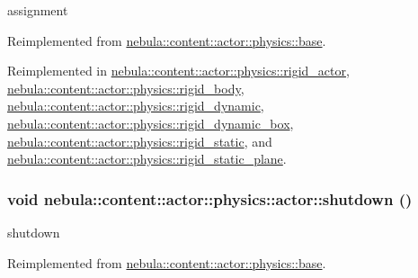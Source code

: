 assignment 

Reimplemented from \hyperlink{classnebula_1_1content_1_1actor_1_1physics_1_1base_a8b950d8d7230bd6899cb3da7b6116f02}{nebula::content::actor::physics::base}.

Reimplemented in \hyperlink{classnebula_1_1content_1_1actor_1_1physics_1_1rigid__actor_aa3d6e979793753e37b9b95b118e40c67}{nebula::content::actor::physics::rigid\_\-actor}, \hyperlink{classnebula_1_1content_1_1actor_1_1physics_1_1rigid__body_afeaa8197cacc9b3f9e2b618f0ee0443b}{nebula::content::actor::physics::rigid\_\-body}, \hyperlink{classnebula_1_1content_1_1actor_1_1physics_1_1rigid__dynamic_a115e82dbc90ce5ae9f8d41724f1bd44d}{nebula::content::actor::physics::rigid\_\-dynamic}, \hyperlink{classnebula_1_1content_1_1actor_1_1physics_1_1rigid__dynamic__box_a26c54eacc3d28dd0b88e7a67fe6635f7}{nebula::content::actor::physics::rigid\_\-dynamic\_\-box}, \hyperlink{classnebula_1_1content_1_1actor_1_1physics_1_1rigid__static_ae32ba52ca54bc1cc78572b931a98600d}{nebula::content::actor::physics::rigid\_\-static}, and \hyperlink{classnebula_1_1content_1_1actor_1_1physics_1_1rigid__static__plane_a507d6d75754916f23d673205d53b3874}{nebula::content::actor::physics::rigid\_\-static\_\-plane}.\hypertarget{classnebula_1_1content_1_1actor_1_1physics_1_1actor_ae995fe68be64a916df1bb7174cb8c7a3}{
\subsubsection[{shutdown}]{\setlength{\rightskip}{0pt plus 5cm}void nebula::content::actor::physics::actor::shutdown ()}}
\label{classnebula_1_1content_1_1actor_1_1physics_1_1actor_ae995fe68be64a916df1bb7174cb8c7a3}


shutdown 

Reimplemented from \hyperlink{classnebula_1_1content_1_1actor_1_1physics_1_1base_a6de64e1ab1a4e3dd3274bfa722c7aed1}{nebula::content::actor::physics::base}.

